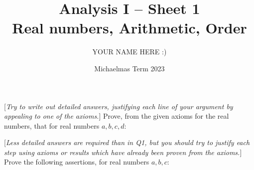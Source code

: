 \documentclass[answers]{exam}
\title{Analysis I -- Sheet 1\\Real numbers, Arithmetic, Order}
\author{YOUR NAME HERE :)}
\date{Michaelmas Term 2023}
\begin{document}
\maketitle
\begin{questions}

\question%
{}[\emph{Try to write out detailed answers, justifying each line of your argument by appealing to one of the axioms.}] Prove, from the given axioms for the real numbers, that for real numbers $a, b, c, d$:



\question%
{}[\emph{Less detailed answers are required than in Q1, but you should try to justify each step using axioms or results which have already been proven from the axioms.}] Prove the following assertions, for real numbers $a, b, c$:
\end{questions}
\end{document}
